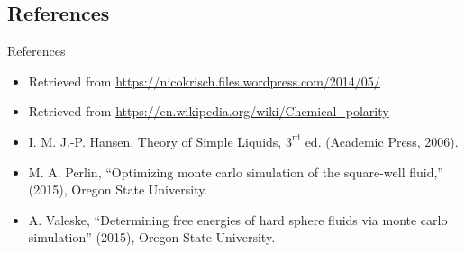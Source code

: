 \documentclass{beamer}
\begin{document}
\subsection*{References}
\begin{frame}{References}
	\tiny
	\begin{itemize}
		\item Retrieved from \url{https://nicokrisch.files.wordpress.com/2014/05/}
		\item Retrieved from \url{https://en.wikipedia.org/wiki/Chemical_polarity}
		\item I. M. J.-P. Hansen, Theory of Simple Liquids, $3^{\text{rd}}$ ed. (Academic Press, 2006).
		\item M. A. Perlin, ``Optimizing monte carlo simulation of the square-well fluid,'' (2015), Oregon State University.
		\item A. Valeske, ``Determining free energies of hard sphere fluids via monte carlo simulation'' (2015), Oregon State University.
	\end{itemize}
\end{frame}
\end{document}
